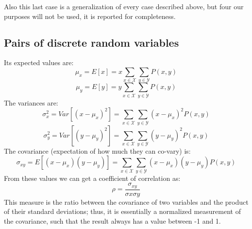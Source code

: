 Also this last case is a generalization of every case described above, but four
our purposes will not be used, it is reported for completeness.

\subsection{Pairs of discrete random variables}


Its expected values are:
\[
	\mu_{x}= E[x] = x\sum_{x \in \mathcal{X}}\sum_{y \in \mathcal{Y}}P(x, y)
\]
\[
	\mu_{y}= E[y] = y\sum_{x \in \mathcal{X}}\sum_{y \in \mathcal{Y}}P(x, y)
\]
The variances are:
\[
	\sigma_{x}^{2}= Var[(x - \mu_{x})^{2}] = \sum_{x \in \mathcal{X}}\sum_{y \in
	\mathcal{Y}}(x - \mu_{x})^{2}P(x, y)
\]
\[
	\sigma_{y}^{2}= Var[(y - \mu_{y})^{2}] = \sum_{x \in \mathcal{X}}\sum_{y \in
	\mathcal{Y}}(y - \mu_{y})^{2}P(x, y)
\]
The covariance (expectation of how much they can co-vary) is:
\[
	\sigma_{xy}= E[(x-\mu_{x})(y-\mu_{y})] = \sum_{x\in \mathcal{X}}\sum_{y \in
	\mathcal{Y}}(x-\mu_{x}) (y - \mu_{y}) P(x, y)
\]
From these values we can get a coefficient of correlation as:
\[
	\rho = \frac{\sigma_{xy}}{\sigma{x}\sigma{y}}
\]
This measure is the ratio between the covariance of two variables and the
product of their standard deviations; thus, it is essentially a normalized
measurement of the covariance, such that the result always has a value between -1
and 1.

